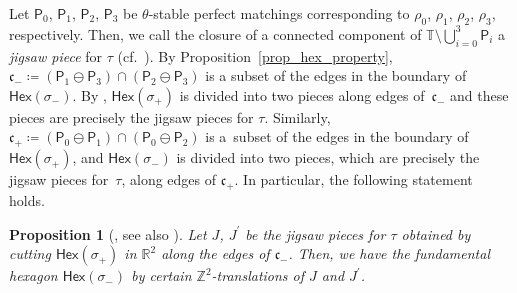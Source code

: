 \documentclass[pdftex]{sigma}
\numberwithin{equation}{section}
\newtheorem{Proposition}[Theorem]{Proposition}
\theoremstyle{definition}
\newcommand{\ZZ}{\mathbb{Z}}
\newcommand{\RR}{\mathbb{R}}
\newcommand{\TT}{\mathbb{T}}
\newcommand{\fkc}{\mathfrak{c}}
\newcommand{\sfP}{\mathsf{P}}
\newcommand{\Hex}{\mathsf{Hex}}
\begin{document}
Let $\sfP_0$, $\sfP_1$, $\sfP_2$, $\sfP_3$ be $\theta$-stable perfect matchings corresponding to $\rho_0$, $\rho_1$, $\rho_2$, $\rho_3$, respectively.
Then, we call the closure of a connected component of $\TT{\setminus}\bigcup_{i=0}^3\sfP_i$ a \emph{jigsaw piece} for $\tau$ (cf.\ \cite[Definition~3.10]{CHT}).
By Proposition~\ref{prop_hex_property}, $\fkc_-\coloneqq(\sfP_1\ominus\sfP_3)\cap(\sfP_2\ominus\sfP_3)$ is a subset of the edges in the boundary of $\Hex(\sigma_-)$.
By \cite[Lemma~3.11]{CHT}, $\Hex(\sigma_+)$ is divided into two pieces along edges of~$\fkc_-$ and these pieces are precisely the jigsaw pieces for $\tau$.
Similarly, $\fkc_+\coloneqq(\sfP_0\ominus\sfP_1)\cap(\sfP_0\ominus\sfP_2)$ is a~subset of the edges in the boundary of $\Hex(\sigma_+)$,
and $\Hex(\sigma_-)$ is divided into two pieces, which are precisely the jigsaw pieces for~$\tau$, along edges of $\fkc_+$.
In particular, the following statement holds.

\begin{Proposition}[{\cite[Theorem~3.12]{CHT}, see also \cite{Nak_GHilb}}]\label{prop_jigsaw}
Let $J$, $J^\prime$ be the jigsaw pieces for $\tau$ obtained by cutting $\Hex(\sigma_+)$ in $\RR^2$ along the edges of $\fkc_-$. Then, we have the fundamental hexagon $\Hex(\sigma_-)$ by certain $\ZZ^2$-translations of $J$ and $J^\prime$.
\end{Proposition}
\end{document}
